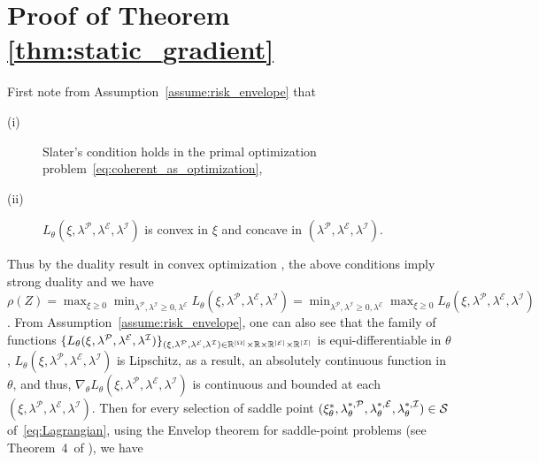 \newpage
\appendix
\onecolumn

\section{Proof of Theorem \ref{thm:static_gradient}}

First note from Assumption~\ref{assume:risk_envelope} that
\begin{description}
\item [(i)] Slater's condition holds in the primal optimization problem~\eqref{eq:coherent_as_optimization},
\item [(ii)] $L_{\theta}(\xi,\lambda^{\mathcal P},\lambda^{\mathcal E},\lambda^{\mathcal I})$ is convex in $\xi$ and concave in $(\lambda^{\mathcal P},\lambda^{\mathcal E},\lambda^{\mathcal I})$.
\end{description}
Thus by the duality result in convex optimization \cite{boyd2009convex}, the above conditions imply strong duality and we have $\rho(Z) = \max_{\xi\geq 0}\min_{\lambda^{\mathcal P},\lambda^{\mathcal I}\geq 0,\lambda^{\mathcal E}} L_{\theta}(\xi,\lambda^{\mathcal P},\lambda^{\mathcal E},\lambda^{\mathcal I})= \min_{\lambda^{\mathcal P},\lambda^{\mathcal I}\geq 0,\lambda^{\mathcal E}}\max_{\xi\geq 0} L_{\theta}(\xi,\lambda^{\mathcal P},\lambda^{\mathcal E},\lambda^{\mathcal I})$. From Assumption~\ref{assume:risk_envelope}, one can also see that the family of functions $\{L_{\theta}(\xi,\lambda^{\mathcal P},\lambda^{\mathcal E},\lambda^{\mathcal I})\}_{(\xi,\lambda^{\mathcal P},\lambda^{\mathcal E},\lambda^{\mathcal I})\in{\mathbb{R}}^{|\Omega|}\times{\mathbb{R}}\times{\mathbb{R}}^{|\mathcal E|}\times{\mathbb{R}}^{|\mathcal I|}}$ is equi-differentiable in $\theta$, $ L_{\theta}(\xi,\lambda^{\mathcal P},\lambda^{\mathcal E},\lambda^{\mathcal I})$ is Lipschitz, as a result, an absolutely continuous function in $\theta$, and thus, $\nabla_\theta L_{\theta}(\xi,\lambda^{\mathcal P},\lambda^{\mathcal E},\lambda^{\mathcal I})$ is continuous and bounded at each $(\xi,\lambda^{\mathcal P},\lambda^{\mathcal E},\lambda^{\mathcal I})$. Then for every selection of saddle point $(\xi^*_{\theta},\lambda^{*,\mathcal P}_{\theta},\lambda^{*,\mathcal E}_{\theta},\lambda^{*,\mathcal I}_{\theta}) \in \mathcal S$ of~\eqref{eq:Lagrangian}, using the Envelop theorem for saddle-point problems (see Theorem~4~of \citealt{milgrom2002envelope}), we have
